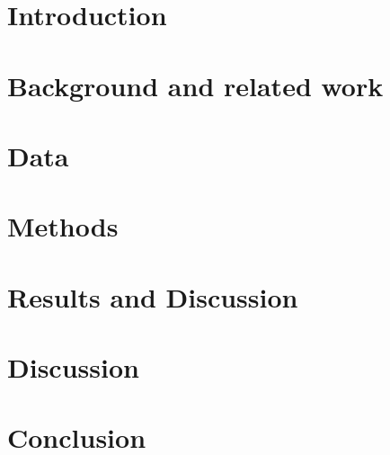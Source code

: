 \documentclass[a4paper,twoside]{book}
\begin{document}


\chapter{Introduction}
\label{ch:intro}


\chapter{Background and related work}
\label{ch:background}


\chapter{Data}
\label{ch:data}


\chapter{Methods}
\label{ch:methods}


\chapter{Results and Discussion}
\label{ch:results}


\chapter{Discussion}
\label{ch:discussion}


\chapter{Conclusion}
\label{ch:conclusion}



\end{document}
